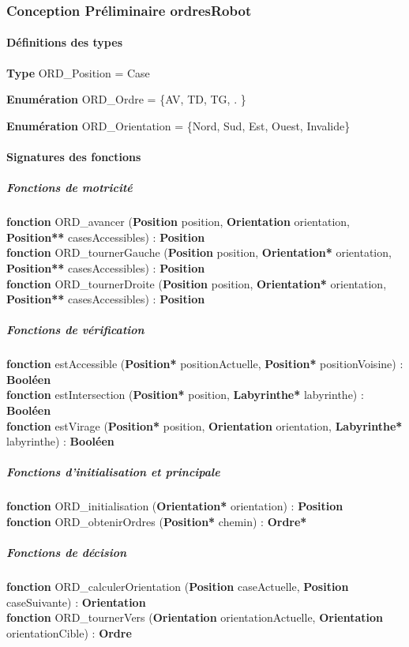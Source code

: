\subsubsection{Conception Préliminaire ordresRobot}

\paragraph{Définitions des types}\mbox{}

\indent\textbf{Type} ORD\_Position = Case

\indent\textbf{Enumération} ORD\_Ordre = \{AV, TD, TG, . \}

\indent\textbf{Enumération} ORD\_Orientation = \{Nord, Sud, Est, Ouest, Invalide\}


\paragraph{Signatures des fonctions}\mbox{}

\subparagraph{Fonctions de motricité}\mbox{}

\noindent\textbf{fonction} ORD\_avancer (\textbf{Position} position, \textbf{Orientation} orientation, \textbf{Position**} casesAccessibles) : \textbf{Position}\\
\noindent\textbf{fonction} ORD\_tournerGauche (\textbf{Position} position, \textbf{Orientation*} orientation, \textbf{Position**} casesAccessibles) : \textbf{Position}\\
\noindent\textbf{fonction} ORD\_tournerDroite (\textbf{Position} position, \textbf{Orientation*} orientation, \textbf{Position**} casesAccessibles) : \textbf{Position}\

\subparagraph{Fonctions de vérification}
\noindent\textbf{fonction} estAccessible (\textbf{Position*} positionActuelle, \textbf{Position*} positionVoisine) : \textbf{Booléen}\\
\noindent\textbf{fonction} estIntersection (\textbf{Position*} position, \textbf{Labyrinthe*} labyrinthe) : \textbf{Booléen}\\
\noindent\textbf{fonction} estVirage (\textbf{Position*} position, \textbf{Orientation} orientation, \textbf{Labyrinthe*} labyrinthe) : \textbf{Booléen}\\


\subparagraph{Fonctions d'initialisation et principale}\mbox{}

\noindent\textbf{fonction} ORD\_initialisation (\textbf{Orientation*} orientation) : \textbf{Position}\\
\noindent\textbf{fonction} ORD\_obtenirOrdres (\textbf{Position*} chemin) : \textbf{Ordre*}\

\subparagraph{Fonctions de décision}\mbox{}
\noindent\textbf{fonction} ORD\_calculerOrientation (\textbf{Position} caseActuelle, \textbf{Position} caseSuivante) : \textbf{Orientation}\\
\noindent\textbf{fonction} ORD\_tournerVers (\textbf{Orientation} orientationActuelle, \textbf{Orientation} orientationCible) : \textbf{Ordre}\\